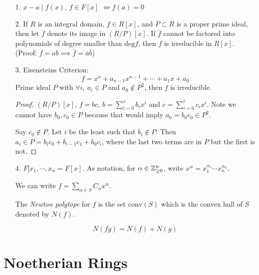 \documentclass[a4paper,twoside,master.tex]{subfiles}
\begin{document}
\begin{itemize}
    \item[1.] $ x - a \mid f(x) $, $ f \in F[x] $ $ \iff f(a) = 0 $
    \item[2.] If $ R $ is an integral domain, $ f \in R[x] $, and $ P \subset R $ is a proper prime ideal, then let $ \bar{f} $ denote its image in $ (R/P)[x] $. If $ \bar{f} $ cannot be factored into polynomials of degree smaller than $ \text{deg} f $, then $ f $ is irreducible in $ R[x] $. (Proof: $ f = a b \implies \bar{f} = \bar{a} \bar{b} $)
    \item[3.] Eisensteins Criterion:
        \begin{equation}
            f = x^n + a_{n-1} x^{n-1} + \cdots + a_1 x + a_0
        \end{equation}
        Prime ideal $ P $ with $ \forall i,\ a_i \in P $ and $ a_0 \notin P^2 $, then $ f $ is irreducible.
        \begin{proof}
            $ (R/P)[x] $, $ f = b c $, $ b = \sum_{i=0}^{s} b_i x^i $ and $ c = \sum_{i=0}^{t} c_i x^i $. Note we cannot have $ b_0, c_0 \in P $ because that would imply $ a_0 = b_0 c_0 \in P^2 $.

            Say $ c_0 \notin P $. Let $ i $ be the least such that $ b_i \notin P $. Then $ a_i \in P = b_i c_0 + b_{i-1} c_1 + b_0 c_i $, where the last two terms are in $ P $ but the first is not.
        \end{proof}
    \item[4.] $ F[x_1, \cdots, x_n = F[x] $. As notation, for $ \alpha \in \mathbb{Z}^n_{\geq 0} $, write $ x^{\alpha} = x_1^{\alpha_1} \cdots x_n^{\alpha_n} $.

            We can write $ f = \sum_{\alpha \in S} C_{\alpha} x^{\alpha} $. 

            \begin{definition}
                The \textit{Newton polytope} for $ f $ is the set $ \text{conv}(S) $ which is the convex hull of $ S $ denoted by $ N(f) $.
            \end{definition}
            \begin{claim}
                \begin{equation}
                    N(fg) = N(f) + N(g)
                \end{equation}
            \end{claim}
\end{itemize}

\section{Noetherian Rings}
\label{sec:noetherian_rings}
\end{document}
